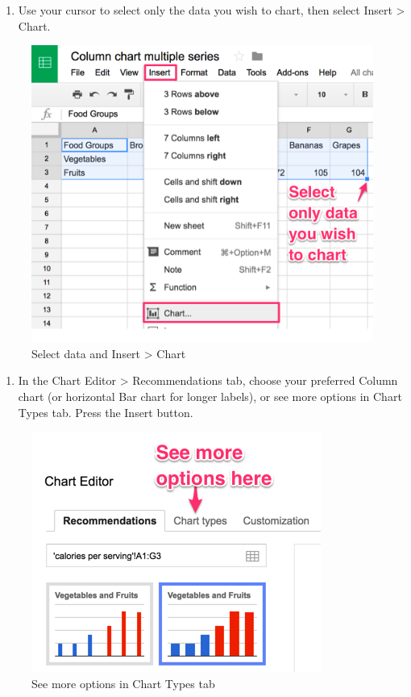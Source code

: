 \documentclass[
  english,
]{book}
\providecommand{\tightlist}{%
  \setlength{\itemsep}{0pt}\setlength{\parskip}{0pt}}
\begin{document}
\begin{enumerate}
\def\labelenumi{\arabic{enumi})}
\setcounter{enumi}{5}
\tightlist
\item
  Use your cursor to select only the data you wish to chart, then select Insert \textgreater{} Chart.
\end{enumerate}

\begin{figure}
\centering
\includegraphics{images/05-chart/column-insert-chart.png}
\caption{Select data and Insert \textgreater{} Chart}
\end{figure}

\begin{enumerate}
\def\labelenumi{\arabic{enumi})}
\setcounter{enumi}{6}
\tightlist
\item
  In the Chart Editor \textgreater{} Recommendations tab, choose your preferred Column chart (or horizontal Bar chart for longer labels), or see more options in Chart Types tab. Press the Insert button.
\end{enumerate}

\begin{figure}
\centering
\includegraphics{images/05-chart/column-chart-types.png}
\caption{See more options in Chart Types tab}
\end{figure}
\end{document}
